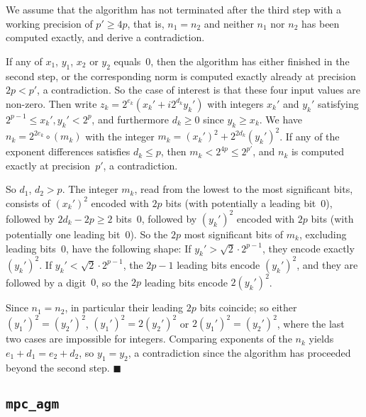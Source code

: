 \documentclass [11pt]{article}
\newcommand {\round}{\operatorname {\circ}}
\renewcommand {\leq}{\leqslant}
\renewcommand {\geq}{\geqslant}
\newenvironment{proof}{\noindent{\bf Proof:}}{{\hspace* {\fill}$\blacksquare$}}
\begin{document}
\begin {proof}
We assume that the algorithm has not terminated after the third step with a
working precision of $p' \geq 4p$, that is, $n_1 = n_2$ and neither
$n_1$ nor $n_2$ has been computed exactly, and derive a contradiction.

If any of $x_1$, $y_1$, $x_2$ or $y_2$ equals~$0$, then the algorithm has
either finished in the second step, or the corresponding norm is computed
exactly already at precision $2p < p'$, a contradiction.
So the case of interest is that these four input values are non-zero.
Then write $z_k = 2^{e_k} (x_k' + i 2^{d_k} y_k')$ with integers
$x_k'$ and $y_k'$ satisfying $2^{p-1} \leq x_k', y_k' < 2^p$, and
furthermore $d_k \geq 0$ since $y_k \geq x_k$.
We have
$n_k = 2^{2 e_k} \round (m_k)$ with the integer
$m_k = (x_k')^2 + 2^{2 d_k} (y_k')^2$.
If any of the exponent differences satisfies $d_k \leq p$, then
$m_k < 2^{4 p} \leq 2^{p'}$, and $n_k$ is computed exactly at precision~$p'$,
a contradiction.

So $d_1$, $d_2 > p$. The integer $m_k$, read from the lowest to the most
significant bits, consists of $(x_k')^2$ encoded with $2 p$ bits (with
potentially a leading bit~$0$), followed by $2 d_k - 2 p \geq 2$ bits~$0$,
followed by $(y_k')^2$ encoded with $2 p$ bits (with potentially one leading
bit~$0$).
So the $2 p$ most significant bits of $m_k$, excluding leading
bits~$0$, have the following shape:
If $y_k' > \sqrt 2 \cdot 2^{p-1}$, they encode exactly $(y_k')^2$.
If $y_k' < \sqrt 2 \cdot 2^{p-1}$, the $2 p - 1$ leading bits encode
$(y_k')^2$, and they are followed by a digit~$0$, so the $2 p$ leading
bits encode $2 (y_k')^2$.

Since $n_1 = n_2$, in particular their leading $2 p$ bits coincide;
so either $(y_1')^2 = (y_2')^2$, $(y_1')^2 = 2 (y_2')^2$ or
$2 (y_1')^2 = (y_2')^2$, where the last two cases are impossible
for integers.
Comparing exponents of the $n_k$ yields
$e_1 + d_1 = e_2 + d_2$, so $y_1 = y_2$,
a contradiction since the algorithm has proceeded beyond the second step.
\end {proof}


\subsection{\texttt {mpc\_agm}}
\end{document}
